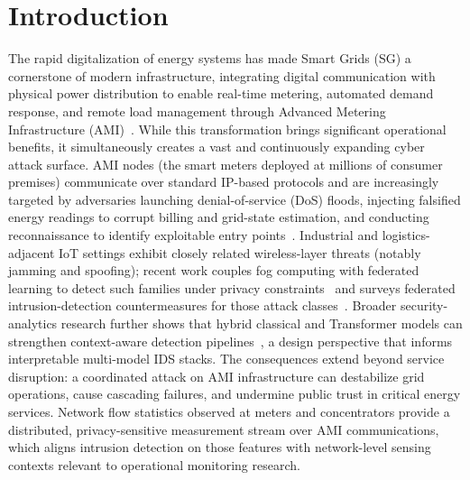 \documentclass[sensors,article,submit,pdftex,moreauthors]{Definitions/mdpi}
\begin{document}
\section{Introduction}\label{sec1}

The rapid digitalization of energy systems has made Smart Grids (SG) a cornerstone of modern infrastructure, integrating digital communication with physical power distribution to enable real-time metering, automated demand response, and remote load management through Advanced Metering Infrastructure (AMI)~\cite{zhang2024federated}. While this transformation brings significant operational benefits, it simultaneously creates a vast and continuously expanding cyber attack surface. AMI nodes (the smart meters deployed at millions of consumer premises) communicate over standard IP-based protocols and are increasingly targeted by adversaries launching denial-of-service (DoS) floods, injecting falsified energy readings to corrupt billing and grid-state estimation, and conducting reconnaissance to identify exploitable entry points~\cite{ciaramella2025method, ajiboye2024privacy, tariq2024fog}. Industrial and logistics-adjacent IoT settings exhibit closely related wireless-layer threats (notably jamming and spoofing); recent work couples fog computing with federated learning to detect such families under privacy constraints~\cite{rehman2024ffl} and surveys federated intrusion-detection countermeasures for those attack classes~\cite{rehman2024fl_jamming_survey}. Broader security-analytics research further shows that hybrid classical and Transformer models can strengthen context-aware detection pipelines~\cite{gulzaib2025inmic}, a design perspective that informs interpretable multi-model IDS stacks. The consequences extend beyond service disruption: a coordinated attack on AMI infrastructure can destabilize grid operations, cause cascading failures, and undermine public trust in critical energy services. Network flow statistics observed at meters and concentrators provide a distributed, privacy-sensitive measurement stream over AMI communications, which aligns intrusion detection on those features with network-level sensing contexts relevant to operational monitoring research.
\end{document}
